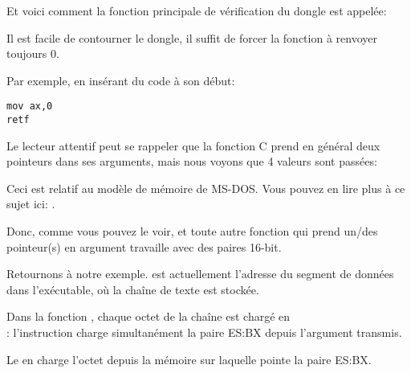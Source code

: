 Et voici comment la fonction principale de vérification du dongle est appelée:



Il est facile de contourner le dongle, il suffit de forcer la fonction 
à renvoyer toujours 0.

Par exemple, en insérant du code à son début:

\begin{lstlisting}[style=customasmx86]
mov ax,0
retf
\end{lstlisting}


Le lecteur attentif peut se rappeler que la fonction C  prend en général
deux pointeurs dans ses arguments, mais nous voyons que 4 valeurs sont passées:



Ceci est relatif au modèle de mémoire de MS-DOS. Vous pouvez en lire plus à ce sujet ici:
.

Donc, comme vous pouvez le voir,  et toute autre fonction qui prend
un/des pointeur(s) en argument travaille avec des paires 16-bit.

Retournons à notre exemple.
 est actuellement l'adresse du segment de données dans l'exécutable, où la
chaîne de texte est stockée.


Dans la fonction , chaque octet de la chaîne est chargé en\\
: l'instruction  charge simultanément la paire ES:BX depuis
l'argument transmis.

Le \MOV en  charge l'octet depuis la mémoire sur laquelle pointe
la paire ES:BX.

%
%
